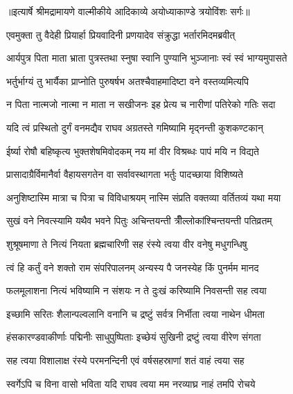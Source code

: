 {॥इत्यार्षे श्रीमद्रामायणे वाल्मीकीये आदिकाव्ये अयोध्याकाण्डे त्रयोविंशः सर्गः॥}


\twolineshloka
{एवमुक्ता तु वैदेही प्रियार्हा प्रियवादिनी}
{प्रणयादेव संक्रुद्धा भर्तारमिदमब्रवीत्} %

\twolineshloka
{आर्यपुत्र पिता माता भ्राता पुत्रस्तथा स्नुषा}
{स्वानि पुण्यानि भुञ्जानाः स्वं स्वं भाग्यमुपासते} %

\twolineshloka
{भर्तुर्भाग्यं तु भार्यैका प्राप्नोति पुरुषर्षभ}
{अतश्चैवाहमादिष्टा वने वस्तव्यमित्यपि} %

\twolineshloka
{न पिता नात्मजो नात्मा न माता न सखीजनः}
{इह प्रेत्य च नारीणां पतिरेको गतिः सदा} %

\twolineshloka
{यदि त्वं प्रस्थितो दुर्गं वनमद्यैव राघव}
{अग्रतस्ते गमिष्यामि मृद्नन्ती कुशकण्टकान्} %

\twolineshloka
{ईर्ष्या रोषौ बहिष्कृत्य भुक्तशेषमिवोदकम्}
{नय मां वीर विश्रब्धः पापं मयि न विद्यते} %

\twolineshloka
{प्रासादाग्रैर्विमानैर्वा वैहायसगतेन वा}
{सर्वावस्थागता भर्तुः पादच्छाया विशिष्यते} %

\twolineshloka
{अनुशिष्टास्मि मात्रा च पित्रा च विविधाश्रयम्}
{नास्मि संप्रति वक्तव्या वर्तितव्यं यथा मया} %

\twolineshloka
{सुखं वने निवत्स्यामि यथैव भवने पितुः}
{अचिन्तयन्ती त्रीँल्लोकांश्चिन्तयन्ती पतिव्रतम्} %

\twolineshloka
{शुश्रूषमाणा ते नित्यं नियता ब्रह्मचारिणी}
{सह रंस्ये त्वया वीर वनेषु मधुगन्धिषु} %

\twolineshloka
{त्वं हि कर्तुं वने शक्तो राम संपरिपालनम्}
{अन्यस्य पै जनस्येह किं पुनर्मम मानद} %

\twolineshloka
{फलमूलाशना नित्यं भविष्यामि न संशयः}
{न ते दुःखं करिष्यामि निवसन्ती सह त्वया} %

\twolineshloka
{इच्छामि सरितः शैलान्पल्वलानि वनानि च}
{द्रष्टुं सर्वत्र निर्भीता त्वया नाथेन धीमता} %

\twolineshloka
{हंसकारण्डवाकीर्णाः पद्मिनीः साधुपुष्पिताः}
{इच्छेयं सुखिनी द्रष्टुं त्वया वीरेण संगता} %

\twolineshloka
{सह त्वया विशालाक्ष रंस्ये परमनन्दिनी}
{एवं वर्षसहस्राणां शतं वाहं त्वया सह} %

\twolineshloka
{स्वर्गेऽपि च विना वासो भविता यदि राघव}
{त्वया मम नरव्याघ्र नाहं तमपि रोचये} %

